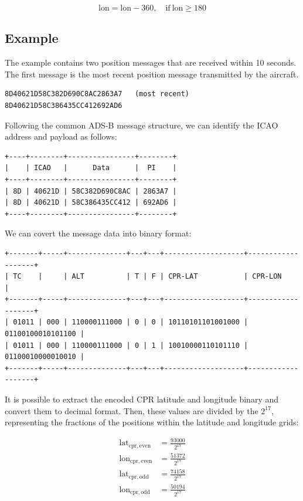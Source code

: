 \begin{equation}
  \mathrm{lon} = \mathrm{lon} - 360,  \quad \text{if}~\mathrm{lon} \ge 180
\end{equation}

\subsection{Example}

The example contains two position messages that are received within 10 seconds. The first message is the most recent position message transmitted by the aircraft.

\begin{verbatim}
8D40621D58C382D690C8AC2863A7   (most recent)
8D40621D58C386435CC412692AD6
\end{verbatim}

Following the common ADS-B message structure, we can identify the ICAO address and payload as follows:

\begin{verbatim}
+----+--------+----------------+--------+
|    | ICAO   |      Data      |  PI    |
+----+--------+----------------+--------+
| 8D | 40621D | 58C382D690C8AC | 2863A7 |
| 8D | 40621D | 58C386435CC412 | 692AD6 |
+----+--------+----------------+--------+
\end{verbatim}

We can covert the message data into binary format:

\begin{verbatim}
+-------+-----+--------------+---+---+-------------------+-------------------+
| TC    |     | ALT          | T | F | CPR-LAT           | CPR-LON           |
+-------+-----+--------------+---+---+-------------------+-------------------+
| 01011 | 000 | 110000111000 | 0 | 0 | 10110101101001000 | 01100100010101100 |
| 01011 | 000 | 110000111000 | 0 | 1 | 10010000110101110 | 01100010000010010 |
+-------+-----+--------------+---+---+-------------------+-------------------+
\end{verbatim}

It is possible to extract the encoded CPR latitude and longitude binary and convert them to decimal format. Then, these values are divided by the $2^{17}$, representing the fractions of the positions within the latitude and longitude grids:

\begin{equation}
  \begin{split}
    \mathrm{lat}_\mathrm{cpr,even} &= \frac{93000}{2^{17}} \\
    \mathrm{lon}_\mathrm{cpr,even} &= \frac{51372}{2^{17}} \\
    \mathrm{lat}_\mathrm{cpr,odd} &=  \frac{74158}{2^{17}} \\
    \mathrm{lon}_\mathrm{cpr,odd} &=  \frac{50194}{2^{17}}
  \end{split}
\end{equation}

